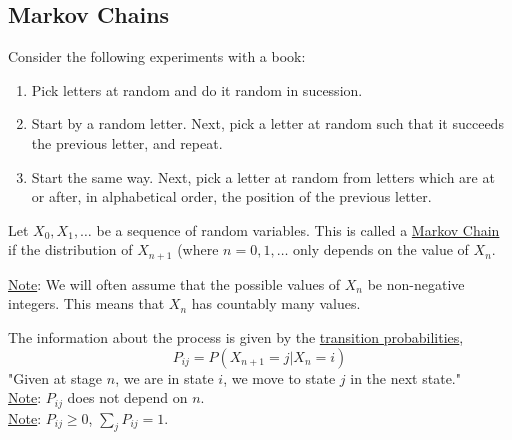   \subsection*{Markov Chains}
    Consider the following experiments with a book:
    \begin{enumerate}
      \item Pick letters at random and do it random in sucession.
      \item Start by a random letter. Next, pick a letter at random such that
        it succeeds the previous letter, and repeat.
      \item Start the same way. Next, pick a letter at random from letters
        which are at or after, in alphabetical order, the position of the
        previous letter.
    \end{enumerate}
    \begin{definition}
      Let $X_0, X_1, \ldots$ be a sequence of random variables. This is 
      called a \underline{Markov Chain} if the distribution of $X_{n+1}$
      (where $n = 0, 1, \ldots$ only depends on the value of $X_n$.
    \end{definition}
    \underline{Note}: We will often assume that the possible values of $X_n$ be 
      non-negative integers. This means that $X_n$ has countably many values.

    \noindent The information about the process is given by the 
      \underline{transition probabilities},
      $$
        P_{ij} = P(X_{n+1} = j | X_n = i)
      $$
      "Given at stage $n$, we are in state $i$, we move to state $j$ in
      the next state."\\
      \underline{Note}: $P_{ij}$ does not depend on $n$.\\
      \underline{Note}: $P_{ij}\ge 0$, $\sum_j P_{ij} = 1$.

